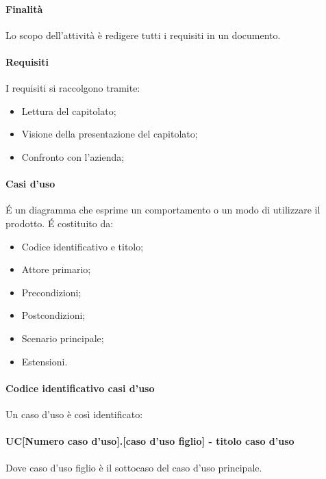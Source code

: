\paragraph{Finalità}
Lo scopo dell'attività è redigere tutti i requisiti in un documento.
\paragraph{Requisiti}
I requisiti si raccolgono tramite:
\begin{itemize}
\item Lettura del capitolato;
\item Visione della presentazione del capitolato;
\item Confronto con l'azienda;
\end{itemize}
\paragraph{Casi d'uso}
\'E un diagramma che esprime un comportamento o un modo di utilizzare il prodotto. \'E costituito da:
\begin{itemize}
\item Codice identificativo e titolo;
\item Attore primario;
\item Precondizioni;
\item Postcondizioni;
\item Scenario principale;
\item Estensioni.
\end{itemize}
\paragraph{Codice identificativo casi d'uso}
Un caso d'uso è così identificato:\\ \\
		\textbf{UC[Numero caso d'uso].[caso d'uso figlio] - titolo caso d'uso}\\ \\
Dove caso d'uso figlio è il sottocaso del caso d'uso principale.
